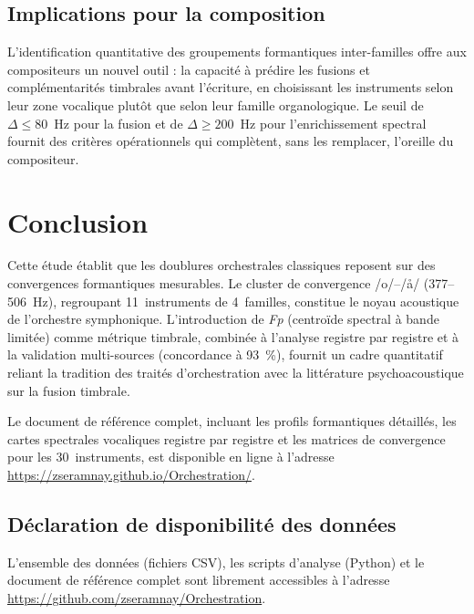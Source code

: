 \documentclass[12pt,a4paper]{article}
\begin{document}
\subsection{Implications pour la composition}

L'identification quantitative des groupements formantiques inter-familles offre aux
compositeurs un nouvel outil : la capacité à prédire les fusions et complémentarités
timbrales avant l'écriture, en choisissant les instruments selon leur zone vocalique
plutôt que selon leur famille organologique. Le seuil de $\Delta \leq 80$~Hz pour la
fusion et de $\Delta \geq 200$~Hz pour l'enrichissement spectral fournit des critères
opérationnels qui complètent, sans les remplacer, l'oreille du compositeur.

\section{Conclusion}

Cette étude établit que les doublures orchestrales classiques reposent sur des
convergences formantiques mesurables. Le cluster de convergence /o/--/\aa/
(377--506~Hz), regroupant 11~instruments de 4~familles, constitue le noyau acoustique
de l'orchestre symphonique. L'introduction de \textit{Fp} (centroïde spectral à bande
limitée) comme métrique timbrale, combinée à l'analyse registre par registre et à la
validation multi-sources (concordance à 93~\%), fournit un cadre quantitatif reliant
la tradition des traités d'orchestration avec la littérature psychoacoustique sur la
fusion timbrale.

Le document de référence complet, incluant les profils formantiques détaillés, les
cartes spectrales vocaliques registre par registre et les matrices de convergence pour
les 30~instruments, est disponible en ligne à l'adresse
\url{https://zseramnay.github.io/Orchestration/}.

\subsection*{Déclaration de disponibilité des données}
L'ensemble des données (fichiers CSV), les scripts d'analyse (Python) et le document
de référence complet sont librement accessibles à l'adresse
\url{https://github.com/zseramnay/Orchestration}.

\end{document}
